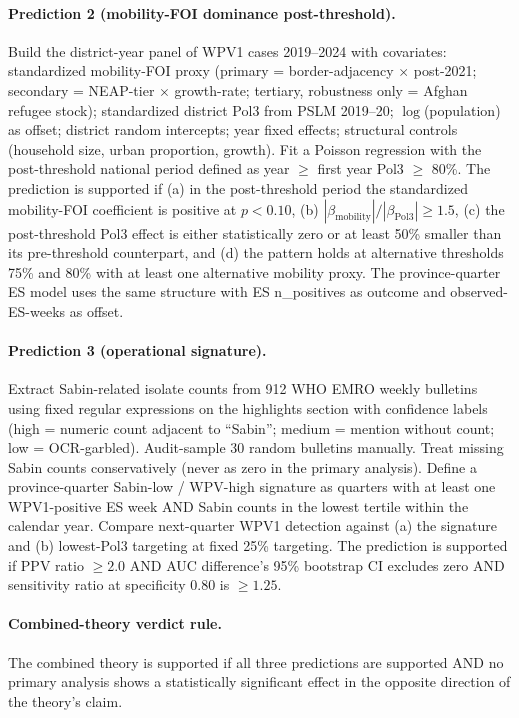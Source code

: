 \documentclass[11pt]{article}
\begin{document}
\paragraph{Prediction 2 (mobility-FOI dominance post-threshold).} Build the district-year panel of WPV1 cases 2019--2024 with covariates: standardized mobility-FOI proxy (primary = border-adjacency $\times$ post-2021; secondary = NEAP-tier $\times$ growth-rate; tertiary, robustness only = Afghan refugee stock); standardized district Pol3 from PSLM 2019--20; $\log$(population) as offset; district random intercepts; year fixed effects; structural controls (household size, urban proportion, growth). Fit a Poisson regression with the post-threshold national period defined as year $\geq$ first year Pol3 $\geq$ 80\%. The prediction is supported if (a) in the post-threshold period the standardized mobility-FOI coefficient is positive at $p<0.10$, (b) $|\beta_\text{mobility}|/|\beta_\text{Pol3}| \geq 1.5$, (c) the post-threshold Pol3 effect is either statistically zero or at least 50\% smaller than its pre-threshold counterpart, and (d) the pattern holds at alternative thresholds 75\% and 80\% with at least one alternative mobility proxy. The province-quarter ES model uses the same structure with ES n\_positives as outcome and observed-ES-weeks as offset.

\paragraph{Prediction 3 (operational signature).} Extract Sabin-related isolate counts from 912 WHO EMRO weekly bulletins using fixed regular expressions on the highlights section with confidence labels (high = numeric count adjacent to ``Sabin''; medium = mention without count; low = OCR-garbled). Audit-sample 30 random bulletins manually. Treat missing Sabin counts conservatively (never as zero in the primary analysis). Define a province-quarter Sabin-low / WPV-high signature as quarters with at least one WPV1-positive ES week AND Sabin counts in the lowest tertile within the calendar year. Compare next-quarter WPV1 detection against (a) the signature and (b) lowest-Pol3 targeting at fixed 25\% targeting. The prediction is supported if PPV ratio $\geq 2.0$ AND AUC difference's 95\% bootstrap CI excludes zero AND sensitivity ratio at specificity 0.80 is $\geq 1.25$.

\paragraph{Combined-theory verdict rule.} The combined theory is supported if all three predictions are supported AND no primary analysis shows a statistically significant effect in the opposite direction of the theory's claim.
\end{document}
